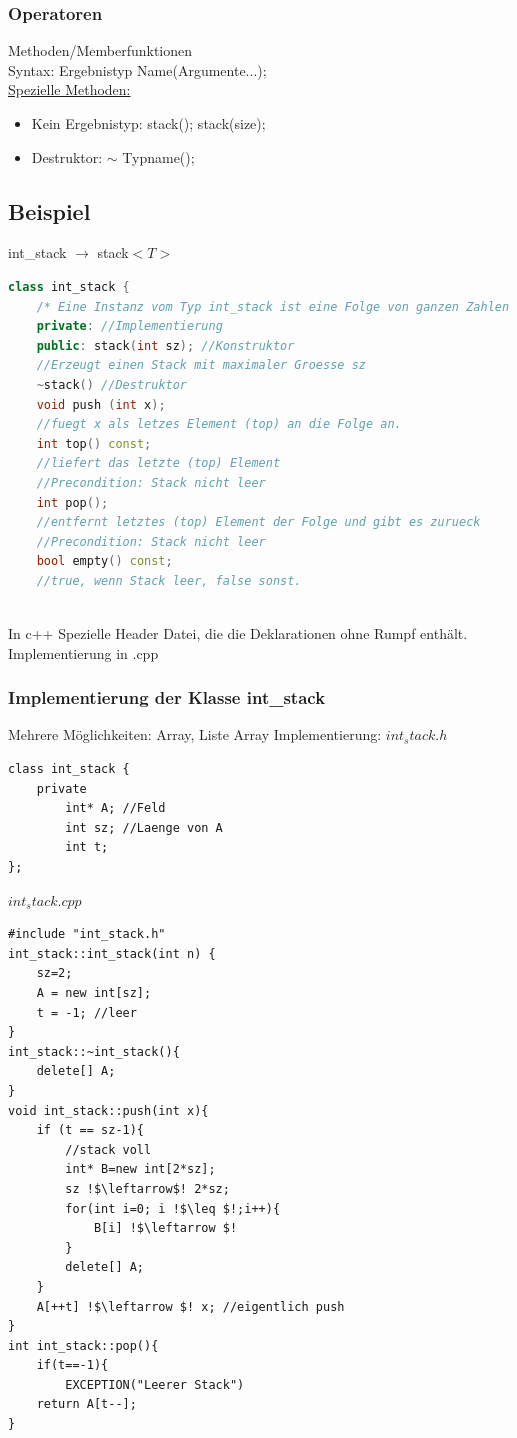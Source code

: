 \documentclass[a4paper]{article}
\begin{document}
\subsubsection*{Operatoren}
Methoden/Memberfunktionen\\
Syntax: Ergebnistyp Name(Argumente...);\\
\underline{Spezielle Methoden:} 
\begin{itemize}
	\item Kein Ergebnistyp: stack(); stack(size);
	\item Destruktor: $\sim$ Typname();
\end{itemize}
\subsection*{Beispiel}
int\_stack $\rightarrow$ stack$<T>$\\
\begin{lstlisting}[language=c++]
class int_stack {
	/* Eine Instanz vom Typ int_stack ist eine Folge von ganzen Zahlen (int). Eine Folge der laenge 0 heisst der leere Stack.*/
	private: //Implementierung
	public: stack(int sz); //Konstruktor
	//Erzeugt einen Stack mit maximaler Groesse sz
	~stack() //Destruktor
	void push (int x);
	//fuegt x als letzes Element (top) an die Folge an.
	int top() const;
	//liefert das letzte (top) Element
	//Precondition: Stack nicht leer
	int pop();
	//entfernt letztes (top) Element der Folge und gibt es zurueck
	//Precondition: Stack nicht leer
	bool empty() const;
	//true, wenn Stack leer, false sonst.
	
\end{lstlisting}
In c++ Spezielle Header Datei, die die Deklarationen ohne Rumpf enthält. Implementierung in .cpp\\
\subsubsection*{Implementierung der Klasse int\_stack}
Mehrere Möglichkeiten: Array, Liste
Array Implementierung:
$int_stack.h$
\begin{lstlisting}
class int_stack {
	private 
		int* A; //Feld
		int sz; //Laenge von A
		int t;
};
\end{lstlisting}
$int_stack.cpp$
\begin{lstlisting}[escapechar=!]
#include "int_stack.h"
int_stack::int_stack(int n) {
	sz=2;
	A = new int[sz];
	t = -1; //leer
}
int_stack::~int_stack(){
	delete[] A;
}
void int_stack::push(int x){
	if (t == sz-1){
		//stack voll
		int* B=new int[2*sz];
		sz !$\leftarrow$! 2*sz;
		for(int i=0; i !$\leq $!;i++){
			B[i] !$\leftarrow $!
		}
		delete[] A;
	}
	A[++t] !$\leftarrow $! x; //eigentlich push
}
int int_stack::pop(){
	if(t==-1){
		EXCEPTION("Leerer Stack")
	return A[t--];
}

\end{lstlisting}
\end{document}
